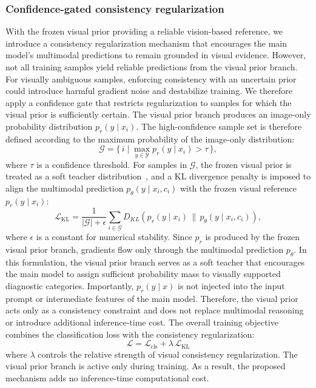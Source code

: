 \documentclass[preprint,12pt]{elsarticle}
\makeatletter
\def@NAT@last@yr{--\NAT@penalty}%
\makeatother
\begin{document}
\subsubsection{Confidence-gated consistency regularization}
With the frozen visual prior providing a reliable vision-based reference, we introduce a consistency regularization mechanism that encourages the main model's multimodal predictions to remain grounded in visual evidence. However, not all training samples yield reliable predictions from the visual prior branch. For visually ambiguous samples, enforcing consistency with an uncertain prior could introduce harmful gradient noise and destabilize training. We therefore apply a confidence gate that restricts regularization to samples for which the visual prior is sufficiently certain. The visual prior branch produces an image-only probability distribution $p_r(y \mid x_i)$. The high-confidence sample set is therefore defined according to the maximum probability of the image-only distribution: \begin{equation}
	\mathcal{G} = \{\, i \mid \max_{y \in \mathcal{Y}} p_r(y \mid x_i) > \tau \,\},
	\label{eq:gated_set}
\end{equation}
where $\tau$ is a confidence threshold. For samples in $\mathcal{G}$, the frozen visual prior is treated as a soft teacher distribution~\cite{hinton2015distilling}, and a KL divergence penalty is imposed to align the multimodal prediction $p_\theta(y \mid x_i,c_i)$ with the frozen visual reference $p_r(y \mid x_i)$:
\begin{equation}
	\mathcal{L}_{\mathrm{KL}} =
	\frac{1}{|\mathcal{G}| + \epsilon}
	\sum_{i \in \mathcal{G}}
	D_{KL}\!\left(
	p_r(y \mid x_i)\,\|\,p_{\theta}(y \mid x_i, c_i)
	\right),
	\label{eq:kl_gated}
\end{equation}
where $\epsilon$ is a constant for numerical stability. Since $p_r$ is produced by the frozen visual prior branch, gradients flow only through the multimodal prediction $p_\theta$. In this formulation, the visual prior branch serves as a soft teacher that encourages the main model to assign sufficient probability mass to visually supported diagnostic categories. Importantly, $p_r(y \mid x)$ is not injected into the input prompt or intermediate features of the main model. Therefore, the visual prior acts only as a consistency constraint and does not replace multimodal reasoning or introduce additional inference-time cost. The overall training objective combines the classification loss with the consistency regularization:
%
\begin{equation}
	\mathcal{L} = \mathcal{L}_{\mathrm{cls}} + \lambda\, \mathcal{L}_{\mathrm{KL}}
	\label{eq:total_loss}
\end{equation}
%
where $\lambda$ controls the relative strength of visual consistency regularization. The visual prior branch is active only during training. As a result, the proposed mechanism adds no inference-time computational cost.
\end{document}
